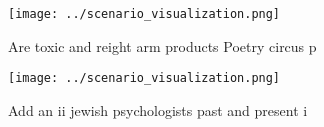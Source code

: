 \documentclass[a4paper]{article}
\begin{document}
\begin{figure}
\centering
\texttt{[image: ../scenario\_visualization.png]}
\caption{Are toxic and reight arm products Poetry circus p
}
\end{figure}
 
\begin{figure}
\centering
\texttt{[image: ../scenario\_visualization.png]}
\caption{Add an ii jewish psychologists past and present i
}
\end{figure}
 
\end{document}
